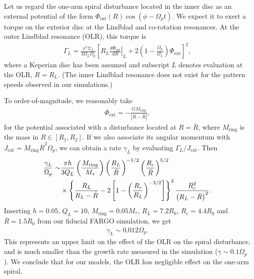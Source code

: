 Let us regard the one-arm spiral disturbance located in the inner disc as an  
external potential of the form $\Phi_\mathrm{ext}(R)\cos{\left(\phi -
    \Omega_pt\right)}$. We expect
it to exert a torque on the exterior disc at the Lindblad  
and co-rotation resonances. At the outer Lindblad resonance (OLR), this
torque is 
\begin{align}
  \Gamma_L =
  \frac{\pi^2\Sigma_L}{3\Omega_L\Omega_p}
\left[\left.R_L\frac{d\Phi_\mathrm{ext}}{dR}\right|_L + 2\left(1 - \frac{\Omega_p}{\Omega_L}\right)\Phi_\mathrm{ext}\right]^2,
\end{align}   
where a Keperian disc has been assumed and subscript $L$ denotes
evaluation at the OLR, $R=R_L$. (The inner Lindblad resonance does not
exist for the pattern speeds observed in our simulations.) 

To order-of-magnitude, we reasonably take
\begin{align}
  \Phi_\mathrm{ext} = -\frac{GM_\mathrm{ring}}{|R - \bar{R}|}, 
\end{align}
for the potential associated with a disturbance located at
$R=\bar{R}$, where $M_\mathrm{ring}$ is the mass in $R\in[R_1,R_2]$.
If we also associate its angular momentum with 
$J_\mathrm{ext}  = M_\mathrm{ring}\bar{R}^2\Omega_p$, we can obtain a
rate $\gamma_L$ by evaluating $\Gamma_L/J_\mathrm{ext}$. Then 
\begin{align}
  \frac{\gamma_L}{\Omega_p} \sim &\frac{\pi h}{3
    Q_L}\left(\frac{M_\mathrm{ring}}{M_*}\right)\left(\frac{R_L}{\bar{R}}\right)^{-1/2}\left(\frac{R_c}{\bar{R}}\right)^{5/2}\notag\\
  &\times \left\{ \frac{R_L}{R_L - \bar{R}} - 2\left[1 -
      \left(\frac{R_c}{R_L}\right)^{-3/2}\right]\right\}^2\frac{R_c^2}{\left(R_L
    - \bar{R}\right)^2}. 
\end{align}
Inserting $h=0.05$, $Q_L=10$, $M_\mathrm{ring} = 0.05M_*$,
$R_L=7.2R_0$, $R_c=4.4R_0$ and $\bar{R}=1.5R_0$ from our fiducial
FARGO simulation, we get
\begin{align}
  \gamma_L \sim 0.012\Omega_p. 
\end{align}
This represents an upper limit on the effect of the OLR on the spiral
disturbance, and is much smaller than the growth rate measured in the
simulation ($\gamma\sim0.1\Omega_p$). We conclude that for our models,
the OLR has negligible effect on the one-arm spiral. 

